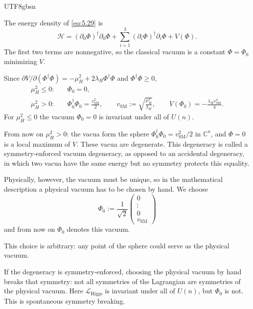 \documentclass[11pt,a4paper,oneside]{report}
\begin{document}
\begin{CJK*}{UTF8}{gbsn}
\begin{itemize}
The energy density of \eqref{eq:5.29} is
\begin{equation*}
\mathcal H=(\partial_0\Phi)^\dagger\partial_0\Phi+\sum_{i=1}^3(\partial_i\Phi)^\dagger\partial_i\Phi+V(\Phi).
\tag{5.31}\label{eq:5.31}
\end{equation*}
The first two terms are nonnegative, so the classical vacuum is a constant $\Phi=\Phi_0$ minimizing $V$.

Since $\partial V/\partial(\Phi^\dagger\Phi)=-\mu_H^2+2\lambda_H\Phi^\dagger\Phi$ and $\Phi^\dagger\Phi\ge0$,
\begin{equation*}
{\displaystyle 
\begin{aligned}
\mu_H^2\le0:&\quad\Phi_0=0,\\
\mu_H^2>0:&\quad\Phi_0^\dagger\Phi_0=\frac{v_{\mathrm{SM}}^2}{2},\qquad
v_{\mathrm{SM}}:=\sqrt{\frac{\mu_H^2}{\lambda_H}},\qquad
V(\Phi_0)=-\frac{\lambda_Hv_{\mathrm{SM}}^4}{4}.
\end{aligned}
}
\tag{5.32}\label{eq:5.32}
\end{equation*}
For $\mu_H^2\le0$ the vacuum $\Phi_0=0$ is invariant under all of $U(n)$.

From now on $\mu_H^2>0$: the vacua form the sphere $\Phi_0^\dagger\Phi_0=v_{\mathrm{SM}}^2/2$ in $\mathbb C^n$, and $\Phi=0$ is a local maximum of $V$.
These vacua are degenerate. This degeneracy is called a symmetry-enforced vacuum degeneracy, as opposed to an accidental degeneracy, in which two vacua have the same energy but no symmetry protects this equality.

Physically, however, the vacuum must be unique, so in the mathematical description a physical vacuum has to be chosen by hand. We choose
\begin{equation*}
{\displaystyle 
\Phi_0:=\frac1{\sqrt2}\begin{pmatrix}0\\\vdots\\0\\v_{\mathrm{SM}}\end{pmatrix}
}
\tag{5.33}\label{eq:5.33}
\end{equation*}
and from now on $\Phi_0$ denotes this vacuum.

This choice is arbitrary: any point of the sphere could serve as the physical vacuum.

If the degeneracy is symmetry-enforced, choosing the physical vacuum by hand breaks that symmetry: not all symmetries of the Lagrangian are symmetries of the physical vacuum. Here $\mathcal L_{\mathrm{Higgs}}$ is invariant under all of $U(n)$, but $\Phi_0$ is not. This is spontaneous symmetry breaking.


\end{itemize}
\end{CJK*}
\end{document}
